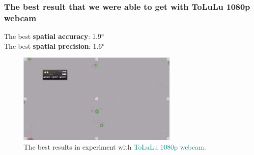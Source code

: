 \documentclass{beamer}
\begin{document}
    \begin{frame}
        \frametitle{The best result that we were able to get with ToLuLu 1080p
        webcam}

        \center
        The best \textbf{spatial accuracy}: \ang{1.9} \\
        The best \textbf{spatial precision}: \ang{1.6}

        \begin{figure}
            \begin{center}
                \includegraphics[width=0.7\textwidth]{Best_res_Tolulu.jpg}
            \end{center}
            \caption{The best results in experiment with
            \textcolor{teal}{ToLuLu 1080p webcam}.}
            \label{fig:Best_Tolulu}
        \end{figure}

    \end{frame}
\end{document}
